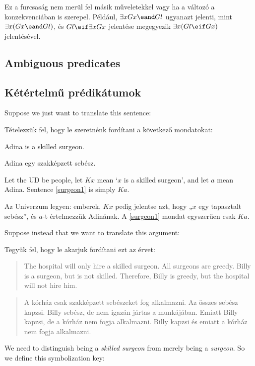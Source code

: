 Ez a furcsaság nem merül fel másik műveletekkel vagy ha a változó a konzekvenciában is szerepel. Például, $\exists x Gx \eand Gl$ ugyanazt jelenti, mint $\exists x (Gx \eand Gl)$, és $Gl \eif \exists x Gx$ jelentése megegyezik $\exists x(Gl \eif Gx)$ jelentésével. 

\subsection*{Ambiguous predicates}
\subsection{Kétértelmű prédikátumok}

Suppose we just want to translate this sentence:

Tételezzük fel, hogy le szeretnénk fordítani a következő mondatokat:
\begin{earg}
\item[\ex{surgeon1}] Adina is a skilled surgeon.
\end{earg}
\begin{earg}
\item[\ex{surgeon1}] Adina egy szakképzett sebész.
\end{earg}
Let the UD be people, let $Kx$ mean `$x$ is a skilled surgeon', and let $a$ mean Adina. Sentence \ref{surgeon1} is simply $Ka$.

Az Univerzum legyen: emberek, $Kx$ pedig jelentse azt, hogy „$x$ egy tapasztalt sebész”, és $a$-t értelmezzük Adinának. A \ref{surgeon1} mondat egyszerűen csak $Ka$.

Suppose instead that we want to translate this argument:

Tegyük fel, hogy le akarjuk fordítani ezt az érvet:
\begin{quote}
The hospital will only hire a skilled surgeon. All surgeons are greedy. Billy is a surgeon, but is not skilled. Therefore, Billy is greedy, but the hospital will not hire him.
\end{quote}
\begin{quote}
A kórház csak szakképzett sebészeket fog alkalmazni. Az összes sebész kapzsi. Billy sebész, de nem igazán jártas a munkájában. Emiatt Billy kapzsi, de a kórház nem fogja alkalmazni. Billy kapzsi és emiatt a kórház nem fogja alkalmazni. 
\end{quote}
We need to distinguish being a \emph{skilled surgeon} from merely being a \emph{surgeon}. So we define this symbolization key:

